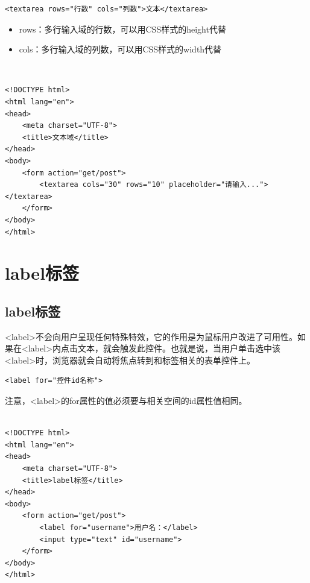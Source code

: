 \begin{lstlisting}[style=htmlcssjs]
<textarea rows="行数" cols="列数">文本</textarea>
\end{lstlisting}

\begin{itemize}
	\item rows：多行输入域的行数，可以用CSS样式的height代替
	\item cols：多行输入域的列数，可以用CSS样式的width代替
\end{itemize}

 \\

\begin{lstlisting}[style=htmlcssjs]
<!DOCTYPE html>
<html lang="en">
<head>
    <meta charset="UTF-8">
    <title>文本域</title>
</head>
<body>
    <form action="get/post">
        <textarea cols="30" rows="10" placeholder="请输入..."></textarea>
    </form>
</body>
</html>
\end{lstlisting}

\newpage

\section{label标签}

\subsection{label标签}

<label>不会向用户呈现任何特殊特效，它的作用是为鼠标用户改进了可用性。如果在<label>内点击文本，就会触发此控件。也就是说，当用户单击选中该<label>时，浏览器就会自动将焦点转到和标签相关的表单控件上。

\begin{lstlisting}[style=htmlcssjs]
<label for="控件id名称">
\end{lstlisting}

注意，<label>的for属性的值必须要与相关空间的id属性值相同。 \\

 \\

\begin{lstlisting}[style=htmlcssjs]
<!DOCTYPE html>
<html lang="en">
<head>
    <meta charset="UTF-8">
    <title>label标签</title>
</head>
<body>
    <form action="get/post">
        <label for="username">用户名：</label>
        <input type="text" id="username">
    </form>
</body>
</html>
\end{lstlisting}

